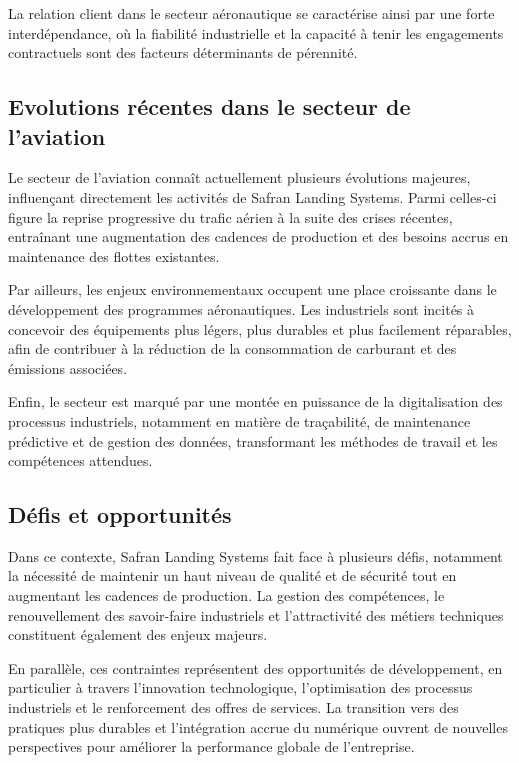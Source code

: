 \noindent La relation client dans le secteur aéronautique se caractérise ainsi par une forte interdépendance, où la fiabilité industrielle et la capacité à tenir les engagements contractuels sont des facteurs déterminants de pérennité.

\subsection*{Evolutions récentes dans le secteur de l'aviation}
{}
Le secteur de l’aviation connaît actuellement plusieurs évolutions majeures, influençant directement les activités de Safran Landing Systems. Parmi celles-ci figure la reprise progressive du trafic aérien à la suite des crises récentes, entraînant une augmentation des cadences de production et des besoins accrus en maintenance des flottes existantes.

\noindent Par ailleurs, les enjeux environnementaux occupent une place croissante dans le développement des programmes aéronautiques. Les industriels sont incités à concevoir des équipements plus légers, plus durables et plus facilement réparables, afin de contribuer à la réduction de la consommation de carburant et des émissions associées.

\noindent Enfin, le secteur est marqué par une montée en puissance de la digitalisation des processus industriels, notamment en matière de traçabilité, de maintenance prédictive et de gestion des données, transformant les méthodes de travail et les compétences attendues.

\subsection*{Défis et opportunités}
{}
Dans ce contexte, Safran Landing Systems fait face à plusieurs défis, notamment la nécessité de maintenir un haut niveau de qualité et de sécurité tout en augmentant les cadences de production. La gestion des compétences, le renouvellement des savoir-faire industriels et l’attractivité des métiers techniques constituent également des enjeux majeurs.

\noindent En parallèle, ces contraintes représentent des opportunités de développement, en particulier à travers l’innovation technologique, l’optimisation des processus industriels et le renforcement des offres de services. La transition vers des pratiques plus durables et l’intégration accrue du numérique ouvrent de nouvelles perspectives pour améliorer la performance globale de l’entreprise.

